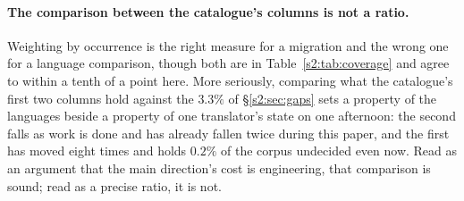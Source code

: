 \paragraph{The comparison between the catalogue's columns is not a ratio.}
Weighting by occurrence is the right measure for a migration and the wrong one for a
language comparison, though both are in Table~\ref{s2:tab:coverage} and agree to within a
tenth of a point here. More seriously, comparing what the catalogue's first two columns
hold against the $3.3\%$ of \S\ref{s2:sec:gaps} sets a property of the languages beside a
property of one translator's state on one afternoon: the second falls as work is done and
has already fallen twice during this paper, and the first has moved eight times and holds
$0.2\%$ of the corpus undecided even now. Read as an argument that the main direction's
cost is engineering, that comparison is sound; read as a precise ratio, it is not.
